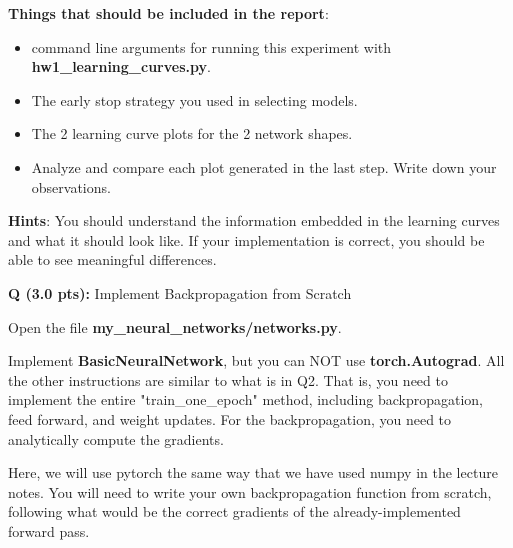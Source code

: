 \documentclass{article}
\newcommand{\homeworknumber}{1}
\newcounter{questionno}
\newcounter{partno}
\newcommand{\question}[1]{
\noindent
\newline
\stepcounter{questionno}
\setcounter{partno}{0}
{\bf Q\arabic{questionno} (#1 pts): }
}
\begin{document}
\hfill
\newpage

\noindent \textbf{Things that should be included in the report}:
  \begin{itemize}
    \item command line arguments for running this experiment with \textbf{hw\homeworknumber\_learning\_curves.py}.
    \item The early stop strategy you used in selecting models.
    \item The 2 learning curve plots for the 2 network shapes.
    \item Analyze and compare each plot generated in the last step. Write down
          your observations.
  \end{itemize}

\noindent \textbf{Hints}: You should understand the information embedded in
    the learning curves and what it should look like. If your implementation
    is correct, you should be able to see meaningful differences.



\question{3.0}{Implement Backpropagation from Scratch}

\noindent Open the file \textbf{my\_neural\_networks/networks.py}.

\hfill

\noindent Implement \textbf{BasicNeuralNetwork}, but you can NOT use \textbf{torch.Autograd}. All the other instructions are similar to what is in Q2. That is, you need to implement the entire "train\_one\_epoch" method, including backpropagation, feed forward, and weight updates. For the backpropagation, you need to analytically compute the gradients.

Here, we will use pytorch the same way that we have used numpy in the lecture notes. You will need to write your own backpropagation function from scratch, following what would be the correct gradients of the already-implemented forward pass.

\hfill
\end{document}
